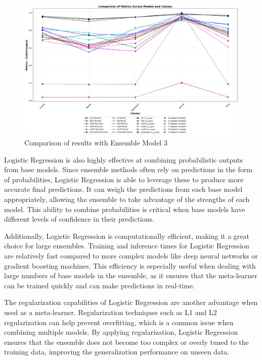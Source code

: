 \begin{figure}[h!]  
    \centering
    \includegraphics[width=1.0\textwidth]{Images/EM FINAL RESULT.png}  
    \caption{Comparison of results with Ensemble Model 3}
    \label{dfdl1244883}  %
\end{figure}

\pagebreak

\noindent
Logistic Regression is also highly effective at combining probabilistic outputs from base models. Since ensemble methods often rely on predictions in the form of probabilities, Logistic Regression is able to leverage these to produce more accurate final predictions. It can weigh the predictions from each base model appropriately, allowing the ensemble to take advantage of the strengths of each model. This ability to combine probabilities is critical when base models have different levels of confidence in their predictions.

\vspace{1em}

\noindent
Additionally, Logistic Regression is computationally efficient, making it a great choice for large ensembles. Training and inference times for Logistic Regression are relatively fast compared to more complex models like deep neural networks or gradient boosting machines. This efficiency is especially useful when dealing with large numbers of base models in the ensemble, as it ensures that the meta-learner can be trained quickly and can make predictions in real-time.

\vspace{1em}

\noindent
The regularization capabilities of Logistic Regression are another advantage when used as a meta-learner. Regularization techniques such as L1 and L2 regularization can help prevent overfitting, which is a common issue when combining multiple models. By applying regularization, Logistic Regression ensures that the ensemble does not become too complex or overly tuned to the training data, improving the generalization performance on unseen data.

